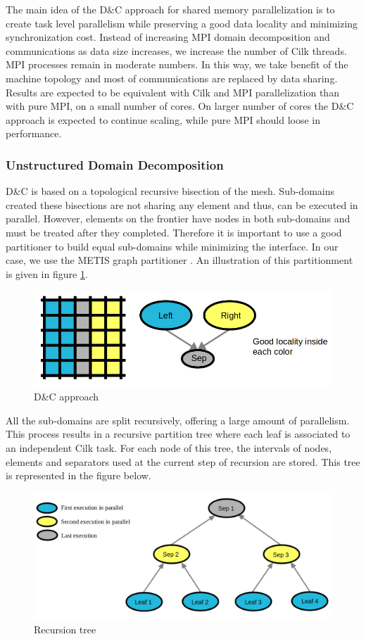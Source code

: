 \documentclass{IOS-Book-Article}
\begin{document}
The main idea of the D\&C approach for shared memory parallelization is to create task level parallelism while preserving a good data locality and minimizing synchronization cost.
Instead of increasing MPI domain decomposition and communications as data size increases, we increase the number of Cilk threads. MPI processes remain in moderate numbers.
In this way, we take benefit of the machine topology and most of communications are replaced by data sharing.
Results are expected to be equivalent with Cilk and MPI parallelization than with pure MPI, on a small number of cores.
On larger number of cores the D\&C approach is expected to continue scaling, while pure MPI should loose in performance.

\subsubsection{Unstructured Domain Decomposition}
D\&C is based on a topological recursive bisection of the mesh. Sub-domains created these bisections are not sharing any element and thus, can be executed in parallel.
However, elements on the frontier have nodes in both sub-domains and must be treated after they completed.
Therefore it is important to use a good partitioner to build equal sub-domains while minimizing the interface. In our case, we use the METIS graph partitioner \cite{Metis}.
An illustration of this partitionment is given in figure \ref{fig:DCapp}.
\begin{figure}[htp]
 \centering
 \includegraphics[scale=0.25]{DC_approach.png}
 \caption{D\&C approach}
 \label{fig:DCapp}
\end{figure}
 
All the sub-domains are split recursively, offering a large amount of parallelism.
This process results in a recursive partition tree where each leaf is associated to an independent Cilk task.
For each node of this tree, the intervals of nodes, elements and separators used at the current step of recursion are stored.
This tree is represented in the figure below.
\begin{figure}[htp]
 \centering
 \includegraphics[scale=0.25]{Recursion_tree.png}
 \caption{Recursion tree}
 \label{fig:RecTree}
\end{figure}
\end{document}
